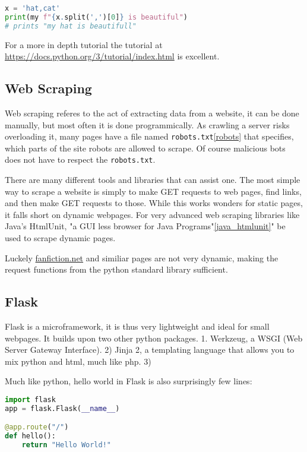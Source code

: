 \documentclass[]{report}   %
\begin{document}
\begin{lstlisting}[language=python]
x = 'hat,cat'
print(my f"{x.split(',')[0]} is beautiful")
# prints "my hat is beautifull"
\end{lstlisting}

For a more in depth tutorial the tutorial at \url{
https://docs.python.org/3/tutorial/index.html} is excellent.

\subsection{Web Scraping}
Web scraping referes to the act of extracting data from a website, it can be
done manually, but most often it is done programmically. As crawling a server
risks overloading it, many pages have a file named
\texttt{robots.txt}\ref{robots} that specifies, which parts of the site robots
are allowed to scrape. Of course malicious bots does not have to respect the
\texttt{robots.txt}.

There are many different tools and libraries that can assist one. The most
simple way to scrape a website is simply to make GET requests to web pages,
find links, and then make GET requests to those. While this works wonders for
static pages, it falls short on dynamic webpages. For very advanced web
scraping libraries like Java's HtmlUnit, "a GUI less browser for Java
Programs"\ref{java_htmlunit}" be used to scrape dynamic pages.

Luckely \url{fanfiction.net} and similiar pages are not very dynamic, making
the request functions from the python standard library sufficient.

\subsection{Flask}
Flask is a microframework, it is thus very lightweight and ideal for small
webpages. It builds upon two other python packages. 1. Werkzeug, a WSGI (Web
Server Gateway Interface). 2) Jinja 2, a templating language that allows you to
mix python and html, much like php. 3) 

Much like python, hello world in Flask is also surprisingly few lines:

\begin{lstlisting}[language=python]
import flask
app = flask.Flask(__name__)

@app.route("/")
def hello():
    return "Hello World!"
\end{lstlisting}
\end{document}
